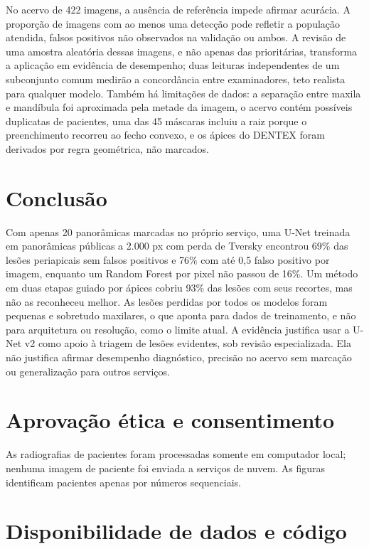 \documentclass[twocolumn]{article}
\begin{document}
No acervo de 422 imagens, a ausência de referência impede afirmar acurácia. A proporção de imagens com ao menos uma detecção pode refletir a população atendida, falsos positivos não observados na validação ou ambos. A revisão de uma amostra aleatória dessas imagens, e não apenas das prioritárias, transforma a aplicação em evidência de desempenho; duas leituras independentes de um subconjunto comum medirão a concordância entre examinadores, teto realista para qualquer modelo. Também há limitações de dados: a separação entre maxila e mandíbula foi aproximada pela metade da imagem, o acervo contém possíveis duplicatas de pacientes, uma das 45 máscaras incluiu a raiz porque o preenchimento recorreu ao fecho convexo, e os ápices do DENTEX foram derivados por regra geométrica, não marcados.

\section{Conclusão}

Com apenas 20 panorâmicas marcadas no próprio serviço, uma U-Net treinada em panorâmicas públicas a 2.000 px com perda de Tversky encontrou 69\% das lesões periapicais sem falsos positivos e 76\% com até 0,5 falso positivo por imagem, enquanto um Random Forest por pixel não passou de 16\%. Um método em duas etapas guiado por ápices cobriu 93\% das lesões com seus recortes, mas não as reconheceu melhor. As lesões perdidas por todos os modelos foram pequenas e sobretudo maxilares, o que aponta para dados de treinamento, e não para arquitetura ou resolução, como o limite atual. A evidência justifica usar a U-Net v2 como apoio à triagem de lesões evidentes, sob revisão especializada. Ela não justifica afirmar desempenho diagnóstico, precisão no acervo sem marcação ou generalização para outros serviços.

\section*{Aprovação ética e consentimento}

 As radiografias de pacientes foram processadas somente em computador local; nenhuma imagem de paciente foi enviada a serviços de nuvem. As figuras identificam pacientes apenas por números sequenciais.

\section*{Disponibilidade de dados e código}
\end{document}
